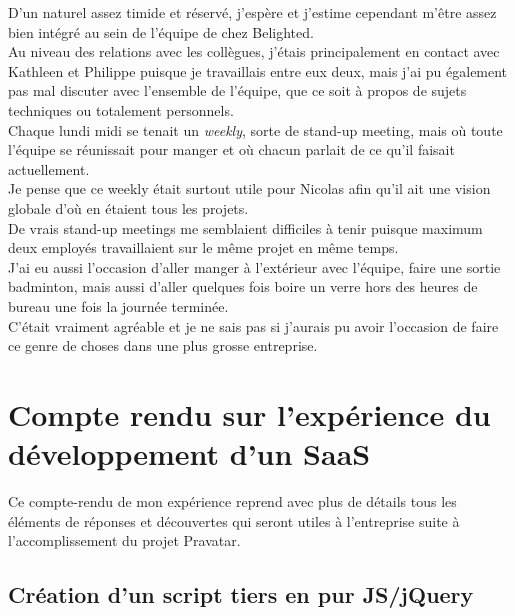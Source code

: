 \documentclass{report}
\begin{document}
    D'un naturel assez timide et réservé, j'espère et j'estime cependant m'être assez bien intégré au sein de l'équipe de chez Belighted.\\

    Au niveau des relations avec les collègues, j'étais principalement en contact avec Kathleen et Philippe puisque je travaillais entre eux deux, mais j'ai pu également pas mal discuter avec
    l'ensemble de l'équipe, que ce soit à propos de sujets techniques ou totalement personnels.\\

    Chaque lundi midi se tenait un \textit{weekly}, sorte de stand-up meeting, mais où toute l'équipe se réunissait pour manger et où chacun parlait de ce qu'il faisait actuellement.\\
    Je pense que ce weekly était surtout utile pour Nicolas afin qu'il ait une vision globale d'où en étaient tous les projets.\\
    De vrais stand-up meetings me semblaient difficiles à tenir puisque maximum deux employés travaillaient sur le même projet en même temps.\\

    J'ai eu aussi l'occasion d'aller manger à l'extérieur avec l'équipe, faire une sortie badminton, mais aussi d'aller quelques fois boire un verre hors des heures de bureau une fois la journée terminée.\\
    C'était vraiment agréable et je ne sais pas si j'aurais pu avoir l'occasion de faire ce genre de choses dans une plus grosse entreprise.\\

  \section{Compte rendu sur l'expérience du développement d'un SaaS}
  \label{sec:Compte rendu sur l'expérience du développement d'un SaaS}

    Ce compte-rendu de mon expérience reprend avec plus de détails tous les éléments de réponses et découvertes qui seront utiles à l'entreprise suite à l'accomplissement du projet Pravatar.\\

    \subsection{Création d'un script tiers en pur JS/jQuery}
    \label{sub:Création d'un script tiers en pur JS/jQuery}
\end{document}
